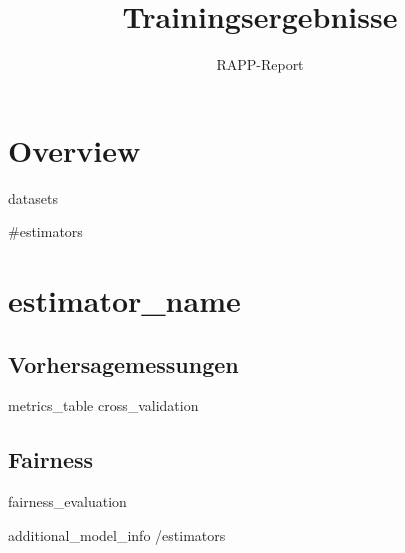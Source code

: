 \documentclass{hhuarticle}
\author{RAPP-Report}
\title{Trainingsergebnisse}
\begin{document}
\maketitle

\tableofcontents

\section{Overview}

{{{datasets}}}

{{#estimators}}
\clearpage
\section{ {{estimator_name}} }

\subsection{Vorhersagemessungen}
{{{metrics_table}}}
{{{cross_validation}}}

\subsection{Fairness}
{{{fairness_evaluation}}}

{{{additional_model_info}}}
{{/estimators}}
\end{document}
